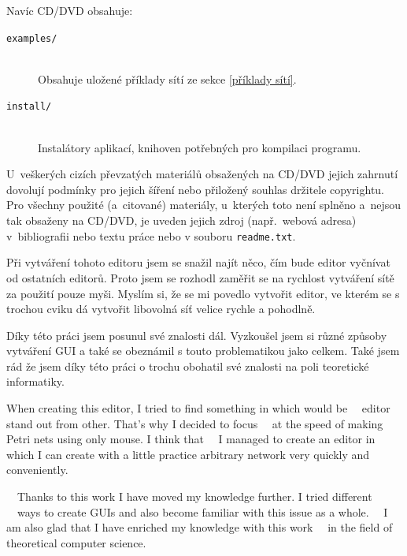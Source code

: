 \documentclass[
  biblatex,
  glossaries,
]{kidiplom}
\begin{document}
Navíc CD/DVD obsahuje:

\begin{description}

  \item[\texttt{examples/}] \hfill \\
        Obsahuje uložené příklady sítí ze sekce \ref{příklady sítí}.

  \item[\texttt{install/}] \hfill \\
        Instalátory aplikací, knihoven potřebných pro kompilaci programu.

\end{description}

U~veškerých cizích převzatých materiálů obsažených na CD/DVD jejich
zahrnutí dovolují podmínky pro jejich šíření nebo přiložený souhlas
držitele copyrightu. Pro všechny použité (a~citované) materiály,
u~kterých toto není splněno a~nejsou tak obsaženy na CD/DVD, je uveden
jejich zdroj (např.~webová adresa) v~bibliografii nebo textu práce
nebo v souboru \texttt{readme.txt}.


\begin{kiconclusions}
  Při vytváření tohoto editoru jsem se snažil najít něco, čím bude 
  editor vyčnívat od ostatních editorů. Proto jsem se rozhodl zaměřit
  se na rychlost vytváření sítě za použití pouze myši. Myslím si, že se 
  mi povedlo vytvořit editor, ve kterém se s trochou cviku dá vytvořit 
  libovolná síť velice rychle a pohodlně.

  Díky této práci jsem posunul své znalosti dál. Vyzkoušel jsem si různé 
  způsoby vytváření GUI a také se obeznámil s touto problematikou jako celkem.
  Také jsem rád že jsem díky této práci o trochu obohatil své znalosti 
  na poli teoretické informatiky.
\end{kiconclusions}

\begin{kiconclusions}[english]
  When creating this editor, I tried to find something in which would be
  editor stand out from other. That's why I decided to focus
  at the speed of making Petri nets using only mouse. I think that
  I managed to create an editor in which I can create with a little practice
  arbitrary network very quickly and conveniently.

  Thanks to this work I have moved my knowledge further. I tried different
  ways to create GUIs and also become familiar with this issue as a whole.
  I am also glad that I have enriched my knowledge with this work
  in the field of theoretical computer science.
\end{kiconclusions}

\nocite{*}

\printbibliography
\end{document}
